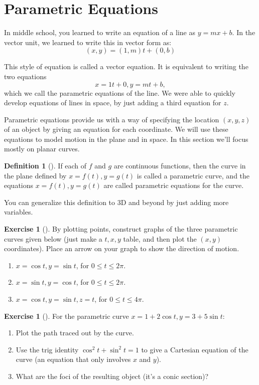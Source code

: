 \documentclass[10pt,]{book}
\theoremstyle{plain}
\theoremstyle{definition}
\newtheorem{definition}[theorem]{Definition}
\theoremstyle{definition}
\theoremstyle{definition}
\theoremstyle{definition}
\newtheorem{exploration}[project]{Exercise}
\theoremstyle{definition}
\numberwithin{equation}{section}
\begin{document}
\section[{Parametric Equations}]{Parametric Equations}\label{section-12}
In middle school, you learned to write an equation of a line as \(y=mx+b\). In the vector unit, we learned to write this in vector form as:%
\begin{equation*}
(x,y)=(1,m)t+(0,b)
\end{equation*}
%
\par
This style of equation is called a vector equation. It is equivalent to writing the two equations%
\begin{equation*}
x=1t+0,y=mt+b,
\end{equation*}
which we call the parametric equations of the line. We were able to quickly develop equations of lines in space, by just adding a third equation for \(z\).%
\par
Parametric equations provide us with a way of specifying the location \((x,y,z)\) of an object by giving an equation for each coordinate. We will use these equations to model motion in the plane and in space. In this section we'll focus mostly on planar curves.%
\begin{definition}[{}]\label{definition-18}
If each of \(f\) and \(g\) are continuous functions, then the curve in the plane defined by \(x=f(t),y=g(t)\) is called a parametric curve, and the equations \(x=f(t),y=g(t)\) are called parametric equations for the curve.%
\end{definition}
You can generalize this definition to 3D and beyond by just adding more variables.%
\begin{exploration}[]\label{exploration-72}
By plotting points, construct graphs of the three parametric curves given below (just make a \(t,x,y\) table, and then plot the \((x,y)\) coordinates). Place an arrow on your graph to show the direction of motion.%
\begin{enumerate}[font=\bfseries,label=(\alph*),ref=\alph*]
\item\label{task-118} \(x=\cos t, y=\sin t\), for \(0\leq t\leq 2\pi\).%
\item\label{task-119} \(x=\sin t, y=\cos t\), for \(0\leq t\leq 2\pi\).%
\item\label{task-120} \(x=\cos t, y=\sin t, z=t\), for \(0\leq t\leq 4\pi\).%
\end{enumerate}
\end{exploration}
\begin{exploration}[]\label{exploration-73}
For the parametric curve \(x=1+2\cos t, y=3+5\sin t\):%
\begin{enumerate}[font=\bfseries,label=(\alph*),ref=\alph*]
\item\label{task-121} Plot the path traced out by the curve.%
\item\label{task-122} Use the trig identity \(\cos^2t+\sin^2t=1\) to give a Cartesian equation of the curve (an equation that only involves \(x\) and \(y\)).%
\item\label{task-123} What are the foci of the resulting object (it's a conic section)?%
\end{enumerate}
\end{exploration}
\end{document}
